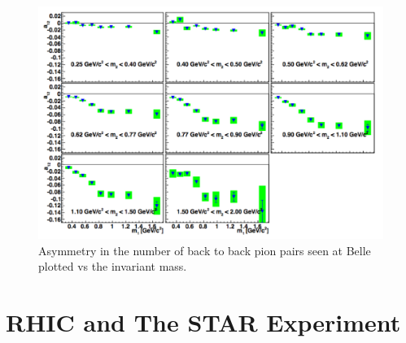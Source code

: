 \documentclass[abstract = on,listof=totoc, bibliography=totoc]{scrreprt}
\begin{document}
 \begin{figure}
\begin{center}
\includegraphics[width = 1\textwidth]{BelleAnnModulationM}
\caption[Asymmetry seen in $e^-e^+$ annihilation at Belle]{Asymmetry in the number of back to back pion pairs seen at Belle plotted vs the invariant mass.}
\label{fig:BelleMod}
\end{center}
\end{figure}





\chapter{RHIC and The STAR Experiment}
\end{document}
